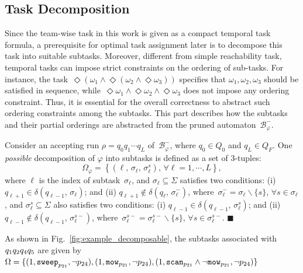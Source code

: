 \subsection{Task Decomposition}\label{subsubsec:task-decompose}
Since the team-wise task in this work is given as a compact temporal task formula,
a prerequisite for optimal task assignment later is to decompose this task into suitable subtasks.
Moreover, different from simple reachability task,
temporal tasks can impose strict constraints on the ordering of sub-tasks.
For instance, the task~$\Diamond (\omega_1 \land \Diamond (\omega_2 \land \Diamond\omega_3)) $
specifies that $\omega_1,\omega_2,\omega_3$ should be satisfied in sequence,
while~$\Diamond\omega_1\land\Diamond\omega_2\land\Diamond\omega_3$ does not impose any ordering constraint.
Thus, it is essential for the overall correctness to abstract such ordering constraints among the subtasks.
This part describes how the subtasks and their partial orderings are abstracted from the pruned automaton~$\mathcal{B}_{\varphi}^{-}$.

\begin{definition} \label{def:subtasks}
Consider an accepting run $\rho=q_0q_1\cdots q_L$ of~$\mathcal{B}_{\varphi}^{-}$,
where $q_0\in Q_0$ and $q_L\in Q_F$.
One \emph{possible} decomposition of $\varphi$ into subtasks is defined
as a set of 3-tuples:
\begin{equation}\label{eq:subtask}
\Omega_{\varphi} = \left\{(\ell,\, \sigma_\ell,\, \sigma^{s}_\ell),\, \forall \ell=1,\cdots,L\right\},
\end{equation}
where $\ell$ is the index of subtask~$\sigma_\ell$,
and $\sigma_\ell\subseteq \Sigma$ satisfies two conditions:
(i) $q_{\ell+1} \in \delta(q_{\ell-1},\,\sigma_\ell)$;
and (ii) $q_{\ell+1} \notin \delta(q_\ell,\,\sigma^-_\ell)$, where~$\sigma^-_\ell =  \sigma_\ell \backslash \{s\}$, $\forall s\in \sigma_\ell$, 
and $\sigma^{s}_\ell\subseteq \Sigma$ also satisfies two conditions:
(i) $q_{\ell-1} \in \delta(q_{\ell-1},\,\sigma^{s}_\ell)$;
and (ii) $q_{\ell-1} \notin \delta(q_{\ell-1},\,\sigma^{s-}_\ell)$, where~$\sigma^{s-}_\ell =  \sigma^{s-}_\ell \backslash \{s\}$, $\forall s\in \sigma^{s-}_\ell$. 
\hfill $\blacksquare$
\end{definition}

\begin{example}
	\label{example:subtask}
        {As shown in Fig.~\ref{fig:example_decomposable},
          the subtasks associated with~$q_1q_2\\q_4q_5$ are given
          by~$\Omega=\{(1,\texttt{sweep}_{p_{21}} ,\lnot p_{24}),
(1,\texttt{mow}_{p_{21}} ,\\\lnot p_{24}),
(1,\texttt{scan}_{p_{21}}\land\lnot \texttt{mow}_{p_{21}} ,\lnot p_{24})\}$}
\end{example}

